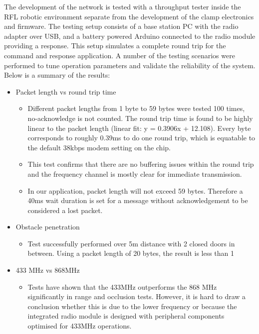 The development of the network is tested with a throughput tester inside the RFL robotic environment separate from the development of the clamp electronics and firmware. The testing setup consists of a base station PC with the radio adapter over USB, and a battery powered Arduino connected to the radio module providing a response. This setup simulates a complete round trip for the command and response application. A number of the testing scenarios were performed to tune operation parameters and validate the reliability of the system. Below is a summary of the results:
\begin{itemize}
    \item Packet length vs round trip time
    \begin{itemize}
        \item Different packet lengths from 1 byte to 59 bytes were tested 100 times, no-acknowledge is not counted. The round trip time is found to be highly linear to the packet length (linear fit: y = 0.3906x + 12.108). Every byte corresponds to roughly 0.39ms to do one round trip, which is equatable to the default 38kbps modem setting on the chip. 
    
        \item This test confirms that there are no buffering issues within the round trip and the frequency channel is mostly clear for immediate transmission.
        \item In our application, packet length will not exceed 59 bytes. Therefore a 40ms wait duration is set for a message without acknowledgement to be considered a lost packet.
    \end{itemize}
    \item Obstacle penetration
    \begin{itemize}
        \item Test successfully performed over 5m distance with 2 closed doors in between. Using a packet length of 20 bytes, the result is less than 1%
    \end{itemize}
    \item 433 MHz vs 868MHz
    \begin{itemize}
        \item Tests have shown that the 433MHz outperforms the 868 MHz significantly in range and occlusion tests. However, it is hard to draw a conclusion whether this is due to the lower frequency or because the integrated radio module is designed with peripheral components optimised for 433MHz operations.
    \end{itemize}
\end{itemize}

